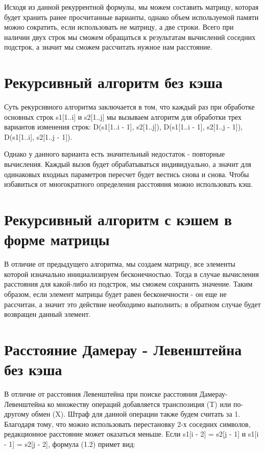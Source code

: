 Исходя из данной рекуррентной формулы, мы можем составить матрицу, которая будет хранить ранее просчитанные варианты, однако объем используемой памяти можно сократить, если использовать не матрицу, а две строки. Всего при наличии двух строк мы сможем обращаться к результатам вычислений соседних подстрок, а значит мы сможем рассчитать нужное нам расстояние.

\section{Рекурсивный алгоритм без кэша}

Суть рекурсивного алгоритма заключается в том, что каждый раз при обработке основных строк s1[1..i] и s2[1..j] мы вызываем алгоритм для обработки трех вариантов изменения строк: D(s1[1..i - 1], s2[1..j]), D(s1[1..i - 1], s2[1..j - 1]), D(s1[1..i], s2[1..j - 1]).

Однако у данного варианта есть значительный недостаток - повторные вычисления. Каждый вызов будет обрабатываться индивидуально, а значит для одинаковых входных параметров пересчет будет вестись снова и снова. Чтобы избавиться от многократного определения расстояния можно использовать кэш. 

\section{Рекурсивный алгоритм с кэшем в форме матрицы}

В отличие от предыдущего алгоритма, мы создаем матрицу, все элементы которой изначально инициализируем бесконечностью. Тогда в случае вычисления расстояния для какой-либо из подстрок, мы сможем сохранить значение. Таким образом, если элемент матрицы будет равен бесконечности - он еще не рассчитан, а значит это действие необходимо выполнить; в обратном случае будет возвращен данный элемент.

\section{Расстояние Дамерау - Левенштейна без кэша}

В отличие от расстояния Левенштейна при поиске расстояния Дамерау-Левенштейна \cite{DamLev} ко множеству операций добавляется транспозиция (T) или по-другому обмен (X). Штраф для данной операции также будем считать за 1. Благодаря тому, что можно использовать перестановку 2-х соседних символов, редакционное расстояние может оказаться меньше. Если s1[i - 2] = s2[j - 1] и s1[i - 1] = s2[j - 2], формула (1.2) примет вид:

